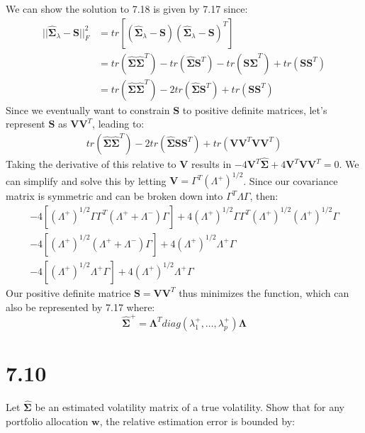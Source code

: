 \documentclass[11pt,]{article}
\begin{document}
We can show the solution to 7.18 is given by 7.17 since: \[
\begin{aligned}
||\hat{{\bm{{\Sigma}}}}_{\lambda} - {\bm{{S}}}||^2_{F} &= tr[(\hat{{\bm{{\Sigma}}}}_{\lambda} - {\bm{{S}}})(\hat{{\bm{{\Sigma}}}}_{\lambda} - {\bm{{S}}})^T] \\
&= tr(\hat{{\bm{{\Sigma}}}}\hat{{\bm{{\Sigma}}}}^T) - tr(\hat{{\bm{{\Sigma}}}} {\bm{{S}}}^T) - tr({\bm{{S}}} \hat{{\bm{{\Sigma}}}}^T) + tr({\bm{{S}}}{\bm{{S}}}^T) \\
&= tr(\hat{{\bm{{\Sigma}}}} \hat{{\bm{{\Sigma}}}}^T) - 2tr(\hat{{\bm{{\Sigma}}}} {\bm{{S}}}^T) +  tr({\bm{{S}}}{\bm{{S}}}^T) 
\end{aligned}
\] Since we eventually want to constrain \({\bm{{S}}}\) to positive
definite matrices, let's represent \({\bm{{S}}}\) as
\({\bm{{V}}}{\bm{{V}}}^T\), leading to: \[
\begin{aligned}
tr(\hat{{\bm{{\Sigma}}}} \hat{{\bm{{\Sigma}}}}^T) - 2tr(\hat{{\bm{{\Sigma}}}} {\bm{{S}}}{\bm{{S}}}^T) +  tr({\bm{{V}}}{\bm{{V}}}^T{\bm{{V}}}{\bm{{V}}}^T) 
\end{aligned}
\] Taking the derivative of this relative to \({\bm{{V}}}\) results in
\(-4{\bm{{V}}}^T\hat{{\bm{{\Sigma}}}} + 4{\bm{{V}}}^T{\bm{{V}}}{\bm{{V}}}^T = 0\).
We can simplify and solve this by letting
\({\bm{{V}}} = \Gamma^T ({\Lambda}^+)^{1/2}\). Since our covariance
matrix is symmetric and can be broken down into
\(\Gamma^T \Lambda \Gamma\), then: \[
\begin{gathered}
-4[(\Lambda^+)^{1/2} \Gamma \Gamma^T (\Lambda^+ + \Lambda^-)\Gamma] + 4(\Lambda^+)^{1/2}\Gamma \Gamma^T (\Lambda^+)^{1/2} (\Lambda^+)^{1/2} \Gamma \\ 
-4[(\Lambda^+)^{1/2} (\Lambda^+ + \Lambda^-) \Gamma] + 
4(\Lambda^+)^{1/2} \Lambda^+ \Gamma \\ 
 -4[(\Lambda^+)^{1/2}\Lambda^+ \Gamma ] + 4 (\Lambda^+)^{1/2} \Lambda^+\Gamma  
\end{gathered}
\] Our positive definite matrice \({\bm{{S}}} = {\bm{{V}}}{\bm{{V}}}^T\)
thus minimizes the function, which can also be represented by 7.17
where: \[
\hat{{\bm{{\Sigma}}}}^+ = {\bm{{\Lambda}}}^T diag(\lambda_1^+, \ldots, \lambda_p^+) {\bm{{\Lambda}}}
\]

\hypertarget{section-1}{%
\section{7.10}\label{section-1}}

Let \(\hat{{\bm{{\Sigma}}}}\) be an estimated volatility matrix of a
true volatility. Show that for any portfolio allocation \({\bm{{w}}}\),
the relative estimation error is bounded by:
\end{document}

